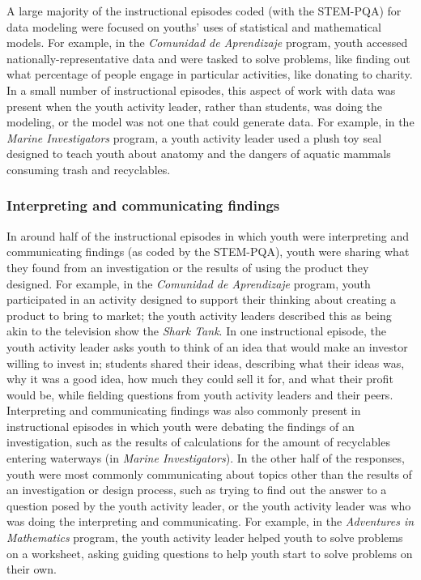 \documentclass[]{book}
\theoremstyle{definition}
\theoremstyle{definition}
\theoremstyle{definition}
\theoremstyle{remark}
\begin{document}
A large majority of the instructional episodes coded (with the STEM-PQA)
for data modeling were focused on youths' uses of statistical and
mathematical models. For example, in the \emph{Comunidad de Aprendizaje}
program, youth accessed nationally-representative data and were tasked
to solve problems, like finding out what percentage of people engage in
particular activities, like donating to charity. In a small number of
instructional episodes, this aspect of work with data was present when
the youth activity leader, rather than students, was doing the modeling,
or the model was not one that could generate data. For example, in the
\emph{Marine Investigators} program, a youth activity leader used a
plush toy seal designed to teach youth about anatomy and the dangers of
aquatic mammals consuming trash and recyclables.

\subsubsection{Interpreting and communicating
findings}\label{interpreting-and-communicating-findings}

In around half of the instructional episodes in which youth were
interpreting and communicating findings (as coded by the STEM-PQA),
youth were sharing what they found from an investigation or the results
of using the product they designed. For example, in the \emph{Comunidad
de Aprendizaje} program, youth participated in an activity designed to
support their thinking about creating a product to bring to market; the
youth activity leaders described this as being akin to the television
show the \emph{Shark Tank}. In one instructional episode, the youth
activity leader asks youth to think of an idea that would make an
investor willing to invest in; students shared their ideas, describing
what their ideas was, why it was a good idea, how much they could sell
it for, and what their profit would be, while fielding questions from
youth activity leaders and their peers. Interpreting and communicating
findings was also commonly present in instructional episodes in which
youth were debating the findings of an investigation, such as the
results of calculations for the amount of recyclables entering waterways
(in \emph{Marine Investigators}). In the other half of the responses,
youth were most commonly communicating about topics other than the
results of an investigation or design process, such as trying to find
out the answer to a question posed by the youth activity leader, or the
youth activity leader was who was doing the interpreting and
communicating. For example, in the \emph{Adventures in Mathematics}
program, the youth activity leader helped youth to solve problems on a
worksheet, asking guiding questions to help youth start to solve
problems on their own.
\end{document}
